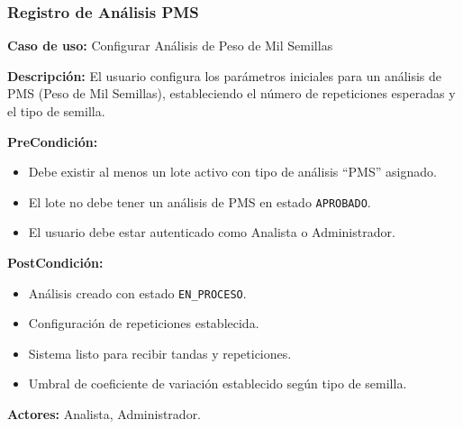 \subsubsection{Registro de Análisis PMS}

\noindent\textbf{Caso de uso:} Configurar Análisis de Peso de Mil Semillas

\vspace{0.5em}
\noindent\textbf{Descripción:} El usuario configura los parámetros iniciales para un análisis de PMS (Peso de Mil Semillas), estableciendo el número de repeticiones esperadas y el tipo de semilla.

\vspace{0.5em}
\noindent\textbf{PreCondición:}
\begin{itemize}[nosep]
    \item Debe existir al menos un lote activo con tipo de análisis ``PMS'' asignado.
    \item El lote no debe tener un análisis de PMS en estado \texttt{APROBADO}.
    \item El usuario debe estar autenticado como Analista o Administrador.
\end{itemize}

\vspace{0.5em}
\noindent\textbf{PostCondición:}
\begin{itemize}[nosep]
    \item Análisis creado con estado \texttt{EN\_PROCESO}.
    \item Configuración de repeticiones establecida.
    \item Sistema listo para recibir tandas y repeticiones.
    \item Umbral de coeficiente de variación establecido según tipo de semilla.
\end{itemize}

\vspace{0.5em}
\noindent\textbf{Actores:} Analista, Administrador.

